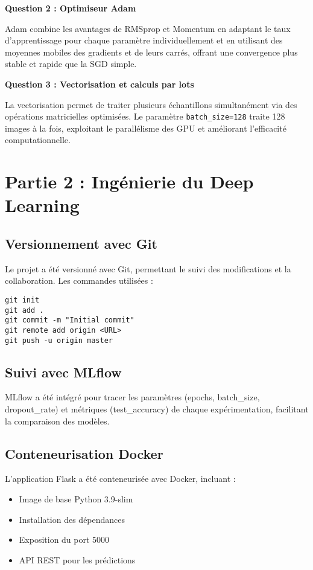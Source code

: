 \documentclass[12pt,a4paper]{article}
\begin{document}
\textbf{Question 2 : Optimiseur Adam}

Adam combine les avantages de RMSprop et Momentum en adaptant le taux d'apprentissage pour chaque paramètre individuellement et en utilisant des moyennes mobiles des gradients et de leurs carrés, offrant une convergence plus stable et rapide que la SGD simple.

\textbf{Question 3 : Vectorisation et calculs par lots}

La vectorisation permet de traiter plusieurs échantillons simultanément via des opérations matricielles optimisées. Le paramètre \texttt{batch\_size=128} traite 128 images à la fois, exploitant le parallélisme des GPU et améliorant l'efficacité computationnelle.

\section{Partie 2 : Ingénierie du Deep Learning}

\subsection{Versionnement avec Git}
Le projet a été versionné avec Git, permettant le suivi des modifications et la collaboration. Les commandes utilisées :
\begin{lstlisting}
git init
git add .
git commit -m "Initial commit"
git remote add origin <URL>
git push -u origin master
\end{lstlisting}

\subsection{Suivi avec MLflow}
MLflow a été intégré pour tracer les paramètres (epochs, batch\_size, dropout\_rate) et métriques (test\_accuracy) de chaque expérimentation, facilitant la comparaison des modèles.

\subsection{Conteneurisation Docker}
L'application Flask a été conteneurisée avec Docker, incluant :
\begin{itemize}
    \item Image de base Python 3.9-slim
    \item Installation des dépendances
    \item Exposition du port 5000
    \item API REST pour les prédictions
\end{itemize}
\end{document}
